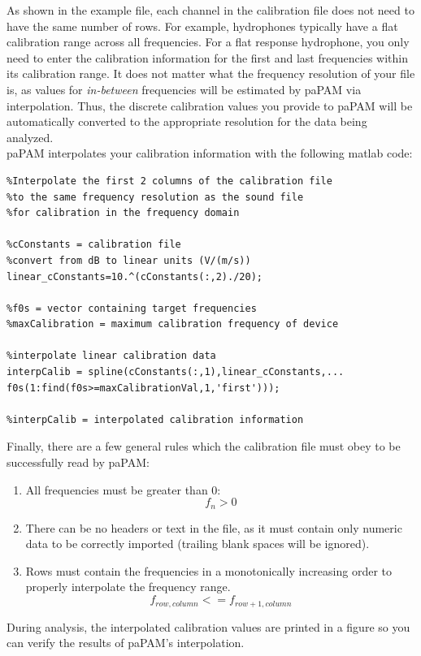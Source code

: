 \documentclass[11pt]{report}
\begin{document}
As shown in the example file, each channel in the calibration file does not need to have the same number of rows.  For example, hydrophones typically have a flat calibration range across all frequencies.  For a flat response hydrophone, you only need to enter the calibration information for the first and last frequencies within its calibration range.  It does not matter what the frequency resolution of your file is, as values for \textit{in-between} frequencies will be estimated by paPAM via interpolation.  Thus, the discrete calibration values you provide to paPAM will be automatically converted to the appropriate resolution for the data being analyzed.\\

	paPAM interpolates your calibration information with the following matlab code:

\begin{lstlisting}
%Interpolate the first 2 columns of the calibration file
%to the same frequency resolution as the sound file
%for calibration in the frequency domain

%cConstants = calibration file
%convert from dB to linear units (V/(m/s))
linear_cConstants=10.^(cConstants(:,2)./20);

%f0s = vector containing target frequencies
%maxCalibration = maximum calibration frequency of device

%interpolate linear calibration data
interpCalib = spline(cConstants(:,1),linear_cConstants,...
f0s(1:find(f0s>=maxCalibrationVal,1,'first')));

%interpCalib = interpolated calibration information

\end{lstlisting}


Finally, there are a few general rules which the calibration file must obey to be successfully read by paPAM:
\begin{enumerate}
\item All frequencies must be greater than 0: $$f_n > 0$$
\item There can be no headers or text in the file, as it must contain only numeric data to be correctly imported (trailing blank spaces will be ignored).
\item Rows must contain the frequencies in a monotonically increasing order to properly interpolate the frequency range. $$f_{row, column} <= f_{row+1, column} $$
\end{enumerate}


	During analysis, the interpolated calibration values are printed in a figure so you can verify the results of paPAM's interpolation.
\end{document}
